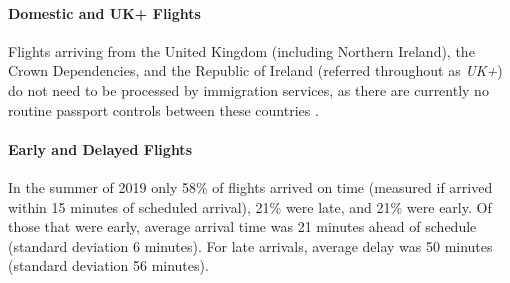 \documentclass[10pt]{article}
\begin{document}
\paragraph{Domestic and UK+ Flights} Flights arriving from the United Kingdom (including Northern Ireland), the Crown Dependencies, and the Republic of Ireland (referred throughout as \textit{UK+}) do not need to be processed by immigration services, as there are currently no routine passport controls between these countries \cite{common_travel_area}.

\paragraph{Early and Delayed Flights}
In the summer of 2019 only 58\% of flights arrived on time (measured if arrived within 15 minutes of scheduled arrival), 21\% were late, and 21\% were early. Of those that were early, average arrival time was 21 minutes ahead of schedule (standard deviation 6 minutes). For late arrivals, average delay was 50 minutes (standard deviation 56 minutes).
\end{document}
